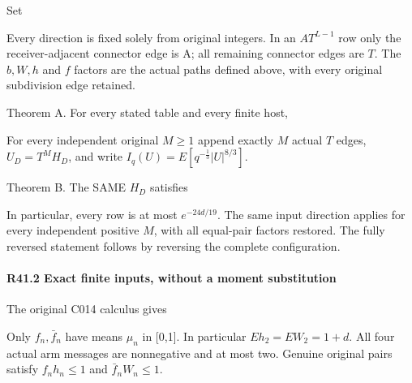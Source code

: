 Set


Every direction is fixed solely from original integers. In an \(A T^{L-1}\) row only the receiver-adjacent connector edge is A; all remaining connector edges are \(T\). The \(b,\allowbreak \allowbreak  W,\allowbreak \allowbreak  h\) and \(f\) factors are the actual paths defined above, with every original subdivision edge retained.

Theorem A. For every stated table and every finite host,

For every independent original \(M\ge 1\) append exactly \(M\) actual \(T\) edges, \(U_D=T^M H_D\), and write \(I_q(U)=E[q^{-\frac{1}{3}}\lvert U\rvert ^{8/3}]\).

Theorem B. The SAME \(H_D\) satisfies


In particular, every row is at most \(e^{-24d/19}\). The same
input direction applies for every independent positive \(M\), with
all equal-pair factors restored. The fully reversed statement follows
by reversing the complete configuration.

\paragraph{R41.2 Exact finite inputs, without a moment substitution}

The original C014 calculus gives


Only \(f_n,\allowbreak \allowbreak \bar f_n\) have means \(\mu_n\) in [0,1]. In particular \(E h_{2}=E W_{2}=1+d\). All four actual arm messages are nonnegative and at most two. Genuine original pairs satisfy \(f_n h_n\le 1\) and \(\bar f_n W_n\le 1\).

